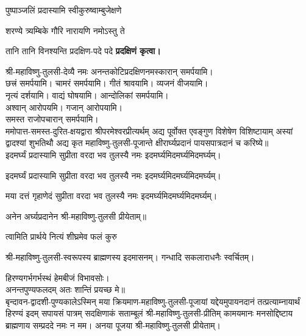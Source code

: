 {पुष्पाञ्जलिं प्रदास्यामि स्वीकुरुष्वाम्बुजेक्षणे}

{शरण्ये त्र्यम्बिके गौरि नारायणि नमोऽस्तु ते}


{तानि तानि विनश्यन्ति प्रदक्षिण-पदे पदे}
\textbf{प्रदक्षिणं कृत्वा।}
\medskip

श्री-महाविष्णु-तुलसी-देव्यै नमः अनन्तकोटिप्रदक्षिणनमस्कारान् समर्पयामि।\\
छत्त्रं समर्पयामि। चामरं समर्पयामि। गीतं श्रावयामि। व्यजनं वीजयामि।\\
नृत्यं दर्शयामि। वाद्यं घोषयामि। आन्दोलिकां समर्पयामि।\\
अश्वान् आरोपयमि। गजान् आरोपयामि।\\
समस्त राजोपचारान् समर्पयामि।\\


ममोपात्त-समस्त-दुरित-क्षयद्वारा श्रीपरमेश्वरप्रीत्यर्थम् अद्य पूर्वोक्त एवङ्गुण विशेषेण विशिष्टायाम् अस्यां द्वादश्यां शुभतिथौ अद्य कृत महाविष्णु-तुलसी-पूजान्ते क्षीरार्घ्यप्रदानं पायसपात्रदानं च करिष्ये॥\\

{इदमर्घ्यं प्रदास्यामि सुप्रीता वरदा भव}
\hfill तुलस्यै नमः इदमर्घ्यमिदमर्घ्यमिदमर्घ्यम्।

{इदमर्घ्यं प्रदास्यामि सुप्रीता वरदा भव}
\hfill तुलस्यै नमः इदमर्घ्यमिदमर्घ्यमिदमर्घ्यम्।

{मया दत्तं गृहाणेदं सुप्रीता वरदा भव}
\hfill तुलस्यै नमः इदमर्घ्यमिदमर्घ्यमिदमर्घ्यम्।

अनेन अर्घ्यप्रदानेन श्री-महाविष्णु-तुलसी प्रीयेताम्॥\\


{त्वामिति प्रार्थये नित्यं शीघ्रमेव फलं कुरु}

श्री-महाविष्णु-तुलसी-स्वरूपस्य ब्राह्मणस्य इदमासनम्। गन्धादि सकलाराधनैः स्वर्चितम्।

हिरण्यगर्भगर्भस्थं हेमबीजं विभावसोः।\\
अनन्तपुण्यफलदम् अतः शान्तिं प्रयच्छ मे॥\\

बृन्दावन-द्वादशी-पुण्यकालेऽस्मिन् मया क्रियमाण-महाविष्णु-तुलसी-पूजायां यद्देयमुपायनदानं तत्प्रत्याम्नायार्थं
हिरण्यं इदम् सपायसं पात्रम् सदक्षिणाकं सताम्बूलं श्री-महाविष्णु-तुलसी-प्रीतिम्
कामयमानः मनसोद्दिष्टाय ब्राह्मणाय सम्प्रददे नमः न मम।
अनया पूजया श्री-महाविष्णु-तुलसी प्रीयेताम्।

